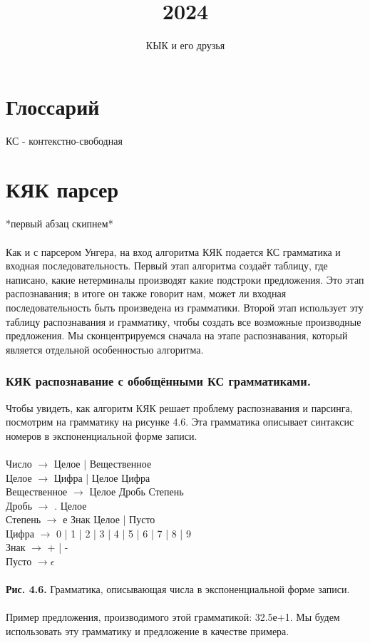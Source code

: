 \documentclass[14pt]{extarticle}
\title{2024}
\author{КЫК и его друзья}
\begin{document}
\maketitle
\tableofcontents

\part*{Глоссарий}

КС - контекстно-свободная

\part{КЯК парсер}
*первый абзац скипнем*
\\\\
Как и с парсером Унгера, на вход алгоритма КЯК подается
КС грамматика и входная последовательность.
Первый этап алгоритма создаёт таблицу, где написано, какие 
нетерминалы производят какие подстроки предложения. 
Это этап распознавания; в итоге он также говорит нам, может
ли входная последовательность быть произведена из грамматики.
Второй этап использует эту таблицу распознавания и грамматику,
чтобы создать все возможные производные предложения. 
Мы сконцентрируемся сначала на этапе распознавания, который
является отдельной особенностью алгоритма. 

\section{КЯК распознавание с обобщёнными КС грамматиками.}

Чтобы увидеть, как алгоритм КЯК решает проблему распознавания
и парсинга, посмотрим на грамматику на рисунке 4.6. 
Эта грамматика описывает синтаксис номеров в экспоненциальной
форме записи. \\
\\
Число $\to$ Целое | Вещественное 
\\
Целое $\to$ Цифра | Целое Цифра 
\\
Вещественное $\to$ Целое Дробь Степень 
\\
Дробь $\to$ . Целое
\\
Степень $\to$ е Знак Целое | Пусто
\\
Цифра $\to$ 0 | 1 | 2 | 3 | 4 | 5 | 6 | 7 | 8 | 9
\\
Знак $\to$ + | -
\\
Пусто $\to \epsilon$\\\\
\textbf{Рис. 4.6.} Грамматика, описывающая числа в экспоненциальной форме записи.
\\\\
Пример предложения, производимого этой грамматикой: 
32.5е+1. Мы будем использовать эту грамматику и предложение
в качестве примера. 
\end{document}
